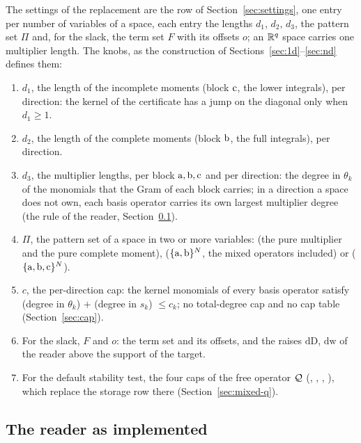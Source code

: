 The settings of the replacement are the row of Section~\ref{sec:settings}, one entry per number of variables of a space, each entry the lengths $d_1$, $d_2$, $d_3$, the pattern set $\Pi$ and, for the slack, the term set $F$ with its offsets $o$; an $\mathbb{R}^q$ space carries one multiplier length. The knobs, as the construction of Sections~\ref{sec:1d}--\ref{sec:nd} defines them:

\begin{enumerate}\setlength\itemsep{0pt}
\item $d_1$, the length of the incomplete moments (block $\mathrm{c}$, the lower integrals), per direction: the kernel of the certificate has a jump on the diagonal only when $d_1\ge1$.
\item $d_2$, the length of the complete moments (block $\mathrm{b}$, the full integrals), per direction.
\item $d_3$, the multiplier lengths, per block $\mathrm{a},\mathrm{b},\mathrm{c}$ and per direction: the degree in $\theta_k$ of the monomials that the Gram of each block carries; in a direction a space does not own, each basis operator carries its own largest multiplier degree (the rule of the reader, Section~\ref{sec:reader-new}).
\item $\Pi$, the pattern set of a space in two or more variables:  (the pure multiplier and the pure complete moment),  ($\{\mathrm{a},\mathrm{b}\}^N$, the mixed operators included) or  ($\{\mathrm{a},\mathrm{b},\mathrm{c}\}^N$).
\item $c$, the per-direction cap: the kernel monomials of every basis operator satisfy (degree in $\theta_k$) $+$ (degree in $s_k$) $\le c_k$; no total-degree cap and no cap table (Section~\ref{sec:cap}).
\item For the slack, $F$ and $o$: the term set and its offsets, and the raises $\mathrm{dD}$, $\mathrm{dw}$ of the reader above the support of the target.
\item For the default stability test, the four caps of the free operator $\mathcal{Q}$ (, , , ), which replace the storage row there (Section~\ref{sec:mixed-q}).
\end{enumerate}

\subsection{The reader as implemented}\label{sec:reader-new}

